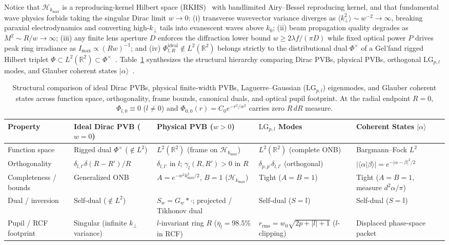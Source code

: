 \documentclass[aps,pra,reprint,amsmath,amssymb,floatfix,longbibliography]{revtex4-2}
\providecommand{\ket}[1]{\lvert#1\rangle}
\providecommand{\braket}[2]{\langle#1\vert#2\rangle}
\providecommand{\abs}[1]{\lvert#1\rvert}
\begin{document}
Notice that $\mathcal{H}_{k_{\max}}$ is a reproducing-kernel Hilbert space (RKHS)~\cite{PaulsenRaghupathi2016} with bandlimited Airy--Bessel reproducing kernel, and that fundamental wave physics forbids taking the singular Dirac limit $w \to 0$: (i) transverse wavevector variance diverges as $\langle k_\perp^2 \rangle \sim w^{-2} \to \infty$, breaking paraxial electrodynamics and converting high-$k_\perp$ tails into evanescent waves above $k_0$; (ii) beam propagation quality degrades as $M^2 \sim R/w \to \infty$; (iii) any finite lens aperture $D$ enforces the diffraction lower bound $w \ge 2\lambda f/(\pi D)$ while fixed optical power $P$ drives peak ring irradiance as $I_{\max} \propto (R w)^{-1}$; and (iv) $\Phi_{l,R}^{\mathrm{ideal}} \notin L^2(\mathbb{R}^2)$ belongs strictly to the distributional dual $\Phi^\times$ of a Gel'fand rigged Hilbert triplet $\Phi \subset L^2(\mathbb{R}^2) \subset \Phi^\times$~\cite{Gelfand1964}. Table~\ref{tab:frame_comparison} synthesizes the structural hierarchy comparing Dirac PVBs, physical PVBs, orthogonal $\mathrm{LG}_{p,l}$ modes, and Glauber coherent states $\ket{\alpha}$~\cite{Klauder1985,Perelomov1986,Gazeau2009}.

\begin{table}[t]
\caption{Structural comparison of ideal Dirac PVBs, physical finite-width PVBs, Laguerre--Gaussian ($\mathrm{LG}_{p,l}$) eigenmodes, and Glauber coherent states across function space, orthogonality, frame bounds, canonical duals, and optical pupil footprint. At the radial endpoint $R = 0$, $\Phi_{l,0} \equiv 0$ ($l \neq 0$) and $\Phi_{0,0}(r) = C_0 e^{-r^2/w^2}$ carries zero $R\,dR$ measure.}
\label{tab:frame_comparison}
\begin{ruledtabular}
\footnotesize
\begin{tabular}{p{2.3cm}p{3.2cm}p{4.4cm}p{3.3cm}p{3.4cm}}
Property & Ideal Dirac PVB ($w=0$) & Physical PVB ($w>0$) & $\mathrm{LG}_{p,l}$ Modes & Coherent States $\ket{\alpha}$ \\
\hline
Function space & Rigged dual $\Phi^\times$ ($\notin L^2$) & $L^2(\mathbb{R}^2)$ (frame on $\mathcal{H}_{k_{\max}}$) & $L^2(\mathbb{R}^2)$ (complete ONB) & Bargmann--Fock $L^2$ \\
Orthogonality & $\delta_{l,l'}\delta(R-R')/R$ & $\delta_{l,l'}$ in $l$; $\gamma_l(R,R') > 0$ in $R$ & $\delta_{p,p'}\delta_{l,l'}$ (orthogonal) & $\abs{\braket{\alpha}{\beta}} = e^{-\abs{\alpha-\beta}^2/2}$ \\
Completeness / bounds & Generalized ONB & $A = e^{-w^2 k_{\max}^2/2},\, B = 1$ ($\mathcal{H}_{k_{\max}}$) & Tight ($A = B = 1$) & Tight ($A = B = 1$, measure $d^2\alpha/\pi$) \\
Dual / inversion & Self-dual ($\notin L^2$) & $S_w = G_w * \cdot$; projected / Tikhonov dual & Self-dual ($S = \mathbb{I}$) & Self-dual ($S = \mathbb{I}$) \\
Pupil / RCF footprint & Singular (infinite $k_\perp$ variance) & $l$-invariant ring $R$ ($\bar{\eta}_l = 98.5\%$ in RCF) & $r_{\mathrm{rms}} = w_0\sqrt{2p+\abs{l}+1}$ ($l$-clipping) & Displaced phase-space packet \\
\end{tabular}
\end{ruledtabular}
\end{table}
\end{document}

